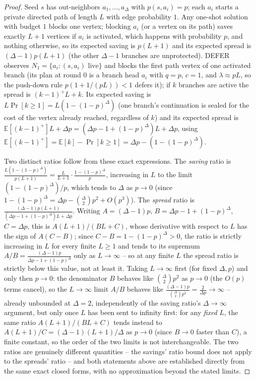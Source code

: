 \documentclass[11pt]{article}
\theoremstyle{definition}
\theoremstyle{remark}
\begin{document}
\begin{proof}
Seed $s$ has out-neighbors $a_1,\dots,a_\Delta$ with $p(s,a_i)=p$; each
$a_i$ starts a private directed path of length $L$ with edge probability
$1$. Any one-shot solution with budget $1$ blocks one vertex; blocking
$a_i$ (or a vertex on its path) saves exactly $L+1$ vertices if $a_i$ is
activated, which happens with probability $p$, and nothing otherwise, so
its expected saving is $p(L+1)$ and its expected spread is
$(\Delta-1)p(L+1)$ (the other $\Delta-1$ branches are unprotected). DEFER
observes $N_1=\{a_i:(s,a_i)\text{ live}\}$ and blocks the first path vertex
of one activated branch (its plan at round $0$ is a branch head $a_i$ with
$q=p$, $c=1$, and $\lambda\approx pL$, so the push-down rule
$p(1+1/(pL))<1$ defers it); if $k$ branches are active the spread is
$(k-1)^+L+k$. Its expected saving is $L\Pr[k\ge1]=L(1-(1-p)^\Delta)$ (one
branch's continuation is sealed for the cost of the vertex already reached,
regardless of $k$) and its expected spread is
$\mathbb E[(k-1)^+]L+\Delta p=(\Delta p-1+(1-p)^\Delta)L+\Delta p$, using
$\mathbb E[(k-1)^+]=\mathbb E[k]-\Pr[k\ge1]=\Delta p-(1-(1-p)^\Delta)$.

Two distinct ratios follow from these exact expressions. The \emph{saving}
ratio is $\frac{L(1-(1-p)^\Delta)}{p(L+1)}=\frac{L}{L+1}\cdot
\frac{1-(1-p)^\Delta}{p}$, increasing in $L$ to the limit
$(1-(1-p)^\Delta)/p$, which tends to $\Delta$ as $p\to0$ (since
$1-(1-p)^\Delta=\Delta p-\binom\Delta2p^2+O(p^3)$). The \emph{spread} ratio
is $\frac{(\Delta-1)p(L+1)}{(\Delta p-1+(1-p)^\Delta)L+\Delta p}$. Writing
$A=(\Delta-1)p$, $B=\Delta p-1+(1-p)^\Delta$, $C=\Delta p$, this is
$A(L+1)/(BL+C)$, whose derivative with respect to $L$ has the sign of
$A(C-B)$; since $C-B=1-(1-p)^\Delta>0$, the ratio is strictly increasing in
$L$ for every finite $L\ge1$ and tends to its supremum $A/B=\frac{(\Delta-1)p}
{\Delta p-1+(1-p)^\Delta}$ only as $L\to\infty$ -- so at any finite $L$ the
spread ratio is strictly below this value, not at least it. Taking
$L\to\infty$ first (for fixed $\Delta,p$) and only then $p\to0$: the
denominator $B$ behaves like $\binom\Delta2p^2$ as $p\to0$ (the $O(p)$
terms cancel), so the $L\to\infty$ limit $A/B$ behaves like
$\frac{(\Delta-1)p}{\binom\Delta2p^2}=\frac{2}{\Delta p}\to\infty$ --
already unbounded at $\Delta=2$, independently of the saving ratio's
$\Delta\to\infty$ argument, but only once $L$ has been sent to infinity
first: for any \emph{fixed} $L$, the same ratio $A(L+1)/(BL+C)$ tends
instead to $A(L+1)/C=(\Delta-1)(L+1)/\Delta$ as $p\to0$ (since $B\to0$
faster than $C$), a finite constant, so the order of the two limits is not
interchangeable. The two ratios are genuinely different quantities -- the
savings' ratio bound does not apply to the spreads' ratio -- and both
statements above are established directly from the same exact closed
forms, with no approximation beyond the stated limits.
\end{proof}
\end{document}
